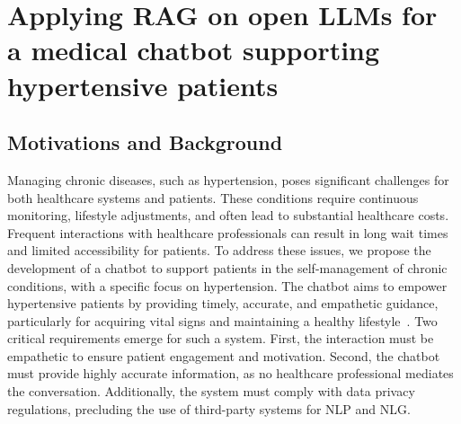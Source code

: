 

\section[RAG on open LLM for medical chatbot]{Applying \gls{RAG} on open \glspl{LLM} for a medical chatbot supporting hypertensive patients}\label{sec:applying-rag-on-open-llm-for-a-medical-chatbot-supporting-hypertensive-patients}

\subsection{Motivations and Background}
\label{subsec:motivations-and-background-rag}
%
Managing chronic diseases, such as hypertension, poses significant challenges for both healthcare systems and patients.
%
These conditions require continuous monitoring, lifestyle adjustments, and often lead to substantial healthcare costs.
%
Frequent interactions with healthcare professionals can result in long wait times and limited accessibility for patients.
%
To address these issues, we propose the development of a chatbot to support patients in the self-management of chronic conditions, with a specific focus on hypertension.
%
The chatbot aims to empower hypertensive patients by providing timely, accurate, and empathetic guidance, particularly for acquiring vital signs and maintaining a healthy lifestyle~\cite{telmed2024,llm-goodit2023}.
%
Two critical requirements emerge for such a system.
%
First, the interaction must be empathetic to ensure patient engagement and motivation.
%
Second, the chatbot must provide highly accurate information, as no healthcare professional mediates the conversation.
%
Additionally, the system must comply with data privacy regulations, precluding the use of third-party systems for \gls{NLP} and \gls{NLG}.

